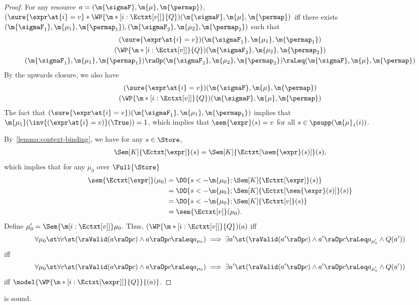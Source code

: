 \documentclass[acmsmall,nonacm,screen,appendix]{acmart}
\begin{document}
\begin{proof}
  For any resource $a = (\m{\sigmaF}, \m{\mu}, \m{\permap})$,
  $(\sure{\expr\at{i}=v} * \WP{\m*[i: {\Ectxt[v]}]}{Q})(\m{\sigmaF}, \m{\mu}, \m{\permap})$ iff
    there exists $(\m{\sigmaF_1}, \m{\mu_1}, \m{\permap_1}), (\m{\sigmaF_2}, \m{\mu_2}, \m{\permap_2})$ such that
\begin{gather*}
      (\sure{\expr\at{i}=v})(\m{\sigmaF_1}, \m{\mu_1}, \m{\permap_1})\\
      (\WP{\m*[i: {\Ectxt[v]}]}{Q})(\m{\sigmaF_2}, \m{\mu_2}, \m{\permap_2})\\
      (\m{\sigmaF_1}, \m{\mu_1}, \m{\permap_1}) \raOp  (\m{\sigmaF_2}, \m{\mu_2}, \m{\permap_2})
      \raLeq (\m{\sigmaF}, \m{\mu}, \m{\permap})
    \end{gather*}
By the upwards closure, we also have
    \begin{gather*}
      (\sure{\expr\at{i}=v})(\m{\sigmaF}, \m{\mu}, \m{\permap}) \\
      (\WP{\m*[i: {\Ectxt[v]}]}{Q})(\m{\sigmaF}, \m{\mu}, \m{\permap})
    \end{gather*}
The fact that $(\sure{\expr\at{i}=v})(\m{\sigmaF_1}, \m{\mu_1}, \m{\permap_1})$
    implies that $\m{\mu_1}(\inv{(\expr\at{i}=v)} (\True)) = 1$,
    which implies that
    $\sem{\expr}(s) = v$ for all $s \in \psupp(\m{\mu}_1(i))$.


    By~\cref{lemma:context-binding}, we have for any $s \in \Store$,
    \begin{align*}
      \Sem[K]{\Ectxt[\expr]}(s) = \Sem[K]{\Ectxt[\sem{\expr}(s)]}(s),
    \end{align*}
    which implies that for any $\mu_0$ over $\Full{\Store}$
    \begin{align*}
      \sem{\Ectxt[\expr]}(\mu_0)
      &= \DO{
        s <- \m{\mu_0};
        \Sem[K]{\Ectxt[\expr]}(s)
      }\\
      &= \DO{
        s <- \m{\mu_0};
        \Sem[K]{\Ectxt[\sem{\expr}(s)]}(s)
      }\\
      &= \DO{
        s <- \m{\mu_0};
        \Sem[K]{\Ectxt[v]}(s)
      }\\
      &= \sem{\Ectxt[v]}(\mu_0).
    \end{align*}
Define $\mu'_0 = \Sem{\m[i: {\Ectxt[v]}]} \mu_0$.
    Thus, $(\WP{\m*[i: {\Ectxt[v]}]}{Q})(a)$ iff
\begin{align*}
  \forall \mu_0 \st
    \forall c\st
    (\raValid(a \raOp c) \land  a\raOp c \raLeq  a_{\mu_0})
      \implies
        \exists a'\st
        (\raValid(a' \raOp c) \land  a'\raOp c \raLeq  a_{\mu'_0} \land Q(a'))
\end{align*}
iff
\begin{align*}
  \forall \mu_0 \st
    \forall c\st
    (\raValid(a \raOp c) \land  a\raOp c \raLeq  a_{\mu_0})
      \implies
        \exists a'\st
        (\raValid(a' \raOp c) \land  a'\raOp c \raLeq  a_{\mu'_0} \land Q(a'))
\end{align*}
iff $\model{\WP{\m*[i: {\Ectxt[\expr]}]}{Q}}{(a)}$.
\end{proof}
 \begin{lemma}
\label{proof:wp-loop-unf}
   is sound.
\end{lemma}
\end{document}
